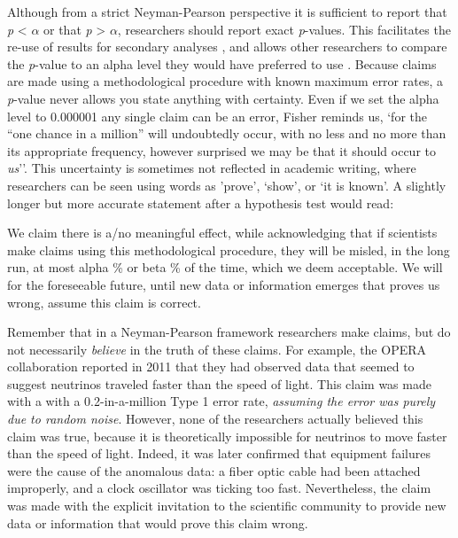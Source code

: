 \documentclass[
  oneside]{krantz}
\renewenvironment{quote}{\begin{VF}}{\end{VF}}
\begin{document}
Although from a strict Neyman-Pearson perspective it is sufficient to report that \emph{p} \textless{} \(\alpha\) or that \emph{p} \textgreater{} \(\alpha\), researchers should report exact \emph{p}-values. This facilitates the re-use of results for secondary analyses \citep{appelbaum_journal_2018}, and allows other researchers to compare the \emph{p}-value to an alpha level they would have preferred to use \citep{lehmann_testing_2005}. Because claims are made using a methodological procedure with known maximum error rates, a \emph{p}-value never allows you state anything with certainty. Even if we set the alpha level to 0.000001 any single claim can be an error, Fisher \citeyearpar{fisher_design_1935} reminds us, `for the ``one chance in a million'' will undoubtedly occur, with no less and no more than its appropriate frequency, however surprised we may be that it should occur to \emph{us}''. This uncertainty is sometimes not reflected in academic writing, where researchers can be seen using words as 'prove', `show', or `it is known'. A slightly longer but more accurate statement after a hypothesis test would read:

\begin{quote}
We claim there is a/no meaningful effect, while acknowledging that if scientists make claims using this methodological procedure, they will be misled, in the long run, at most alpha \% or beta \% of the time, which we deem acceptable. We will for the foreseeable future, until new data or information emerges that proves us wrong, assume this claim is correct.
\end{quote}

Remember that in a Neyman-Pearson framework researchers make claims, but do not necessarily \emph{believe} in the truth of these claims. For example, the OPERA collaboration reported in 2011 that they had observed data that seemed to suggest neutrinos traveled faster than the speed of light. This claim was made with a with a 0.2-in-a-million Type 1 error rate, \emph{assuming the error was purely due to random noise}. However, none of the researchers actually believed this claim was true, because it is theoretically impossible for neutrinos to move faster than the speed of light. Indeed, it was later confirmed that equipment failures were the cause of the anomalous data: a fiber optic cable had been attached improperly, and a clock oscillator was ticking too fast. Nevertheless, the claim was made with the explicit invitation to the scientific community to provide new data or information that would prove this claim wrong.
\end{document}
